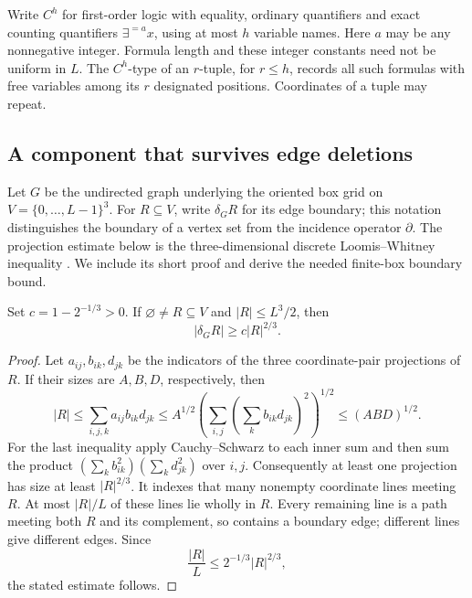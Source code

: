 Write \(C^h\) for first-order logic with equality, ordinary quantifiers and
exact counting quantifiers \(\exists^{=a}x\), using at most \(h\) variable
names.  Here \(a\) may be any nonnegative integer.  Formula length and these
integer constants need not be uniform in \(L\).  The \(C^h\)-type of an
\(r\)-tuple, for \(r\le h\), records all such formulas with free variables
among its \(r\) designated positions.  Coordinates of a tuple may repeat.

\subsection{A component that survives edge deletions}

Let \(G\) be the undirected graph underlying the oriented box grid on
\(V=\{0,\ldots,L-1\}^3\).  For \(R\subseteq V\), write
\(\delta_G R\) for its edge boundary; this notation distinguishes the
boundary of a vertex set from the incidence operator \(\partial\).
The projection estimate below is the three-dimensional discrete
Loomis--Whitney inequality \cite{loomisWhitney1949}.
We include its short proof and derive the needed finite-box boundary bound.

\begin{lemma}
\label{lem:box-boundary}
Set \(c=1-2^{-1/3}>0\).  If \(\varnothing\ne R\subseteq V\) and
\(|R|\le L^3/2\), then
\[
 |\delta_G R|\ge c|R|^{2/3}.
\]
\end{lemma}
\begin{proof}
Let \(a_{ij},b_{ik},d_{jk}\) be the indicators of the three coordinate-pair
projections of \(R\).  If their sizes are \(A,B,D\), respectively, then
\[
 |R|\le\sum_{i,j,k}a_{ij}b_{ik}d_{jk}
 \le A^{1/2}\left(\sum_{i,j}
                  \left(\sum_k b_{ik}d_{jk}\right)^2\right)^{1/2}
 \le(ABD)^{1/2}.
\]
For the last inequality apply Cauchy--Schwarz to each inner sum and then
sum the product
\((\sum_k b_{ik}^2)(\sum_k d_{jk}^2)\) over \(i,j\).
Consequently at least one projection has size at least \(|R|^{2/3}\).
It indexes that many nonempty coordinate lines meeting \(R\).  At most
\(|R|/L\) of these lines lie wholly in \(R\).  Every remaining line is a
path meeting both \(R\) and its complement, so contains a boundary edge;
different lines give different edges.  Since
\[
 \frac{|R|}{L}\le 2^{-1/3}|R|^{2/3},
\]
the stated estimate follows.
\end{proof}

